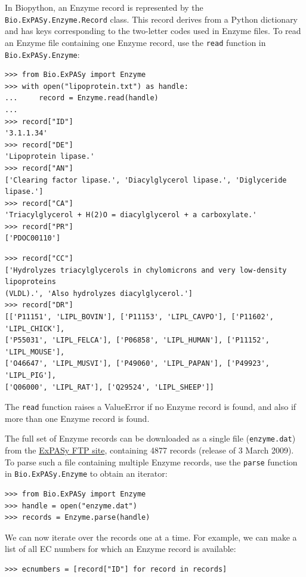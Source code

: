 \documentclass{report}
\begin{document}
In Biopython, an Enzyme record is represented by the \verb|Bio.ExPASy.Enzyme.Record| class. This record derives from a Python dictionary and has keys corresponding to the two-letter codes used in Enzyme files. To read an Enzyme file containing one Enzyme record, use the \verb+read+ function in \verb|Bio.ExPASy.Enzyme|:

\begin{verbatim}
>>> from Bio.ExPASy import Enzyme
>>> with open("lipoprotein.txt") as handle:
...     record = Enzyme.read(handle)
...
>>> record["ID"]
'3.1.1.34'
>>> record["DE"]
'Lipoprotein lipase.'
>>> record["AN"]
['Clearing factor lipase.', 'Diacylglycerol lipase.', 'Diglyceride lipase.']
>>> record["CA"]
'Triacylglycerol + H(2)O = diacylglycerol + a carboxylate.'
>>> record["PR"]
['PDOC00110']
\end{verbatim}
\begin{verbatim}
>>> record["CC"]
['Hydrolyzes triacylglycerols in chylomicrons and very low-density lipoproteins
(VLDL).', 'Also hydrolyzes diacylglycerol.']
>>> record["DR"]
[['P11151', 'LIPL_BOVIN'], ['P11153', 'LIPL_CAVPO'], ['P11602', 'LIPL_CHICK'],
['P55031', 'LIPL_FELCA'], ['P06858', 'LIPL_HUMAN'], ['P11152', 'LIPL_MOUSE'],
['O46647', 'LIPL_MUSVI'], ['P49060', 'LIPL_PAPAN'], ['P49923', 'LIPL_PIG'],
['Q06000', 'LIPL_RAT'], ['Q29524', 'LIPL_SHEEP']]
\end{verbatim}
The \verb+read+ function raises a ValueError if no Enzyme record is found, and also if more than one Enzyme record is found.

The full set of Enzyme records can be downloaded as a single file (\verb|enzyme.dat|) from the \href{ftp://ftp.expasy.org/databases/enzyme/enzyme.dat}{ExPASy FTP site}, containing 4877 records (release of 3 March 2009). To parse such a file containing multiple Enzyme records, use the \verb+parse+ function in \verb+Bio.ExPASy.Enzyme+ to obtain an iterator:

\begin{verbatim}
>>> from Bio.ExPASy import Enzyme
>>> handle = open("enzyme.dat")
>>> records = Enzyme.parse(handle)
\end{verbatim}

We can now iterate over the records one at a time. For example, we can make a list of all EC numbers for which an Enzyme record is available:
\begin{verbatim}
>>> ecnumbers = [record["ID"] for record in records]
\end{verbatim}
\end{document}
